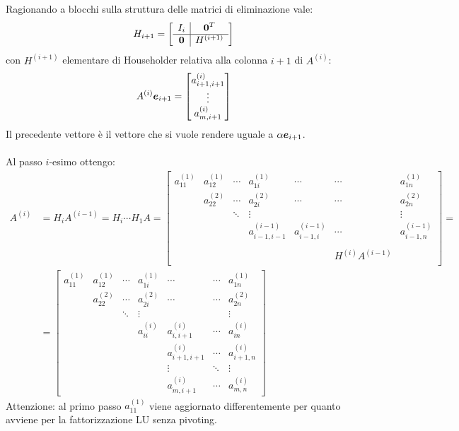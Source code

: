 \begin{oss}
Ragionando a blocchi sulla struttura delle matrici di eliminazione vale:
\begin{displaymath}
H_{i+1} = \left [ \begin{array}{c|c}
I_{i} 		& 	\boldsymbol{0}^{T} \\
\hline
\boldsymbol{0}	&	H^{(i+1)}
\end{array} \right ]
\end{displaymath}
con $H^{(i+1)}$ elementare di Householder relativa alla colonna $i+1$ di
$A^{(i)}$:
\begin{displaymath}
A^{(i)}\boldsymbol{e}_{i+1} = \begin{bmatrix}
a_{i+1, i+1}^{(i)} \\
\vdots \\
a_{m, i+1}^{(i)}
\end{bmatrix}
\end{displaymath}
Il precedente vettore \`e il vettore che si vuole rendere uguale a
$\alpha\boldsymbol{e}_{i+1}$.
\\\\
Al passo $i$-esimo ottengo:
\begin{displaymath}
\begin{split}
A^{(i)} &= H_{i}A^{(i-1)} = H_{i} \cdots H_{1}A  =
\begin{bmatrix}
a_{11}^{(1)} & a_{12}^{(1)} & \cdots & a_{1i}^{(1)}	& \cdots & \cdots &
a_{1n}^{(1)} \\ 
	& a_{22}^{(2)} & \cdots	& a_{2i}^{(2)} & \cdots & \cdots & a_{2n}^{(2)} \\
	&	&	\ddots	& \vdots &	&	& \vdots \\
	&	&	& a_{i-1,i-1}^{(i-1)}	& a_{i-1,i}^{(i-1)} & \cdots & a_{i-1,n}^{(i-1)}  \\
	&	&	& 	&  \\
 	& 	&	&	&  & H^{(i)}A^{(i-1)} &  \\
	& 	&	&	& 	&		&  
\end{bmatrix} = \\ 
& = \begin{bmatrix}
a_{11}^{(1)} & a_{12}^{(1)} & \cdots & a_{1i}^{(1)}	& \cdots & \cdots &
a_{1n}^{(1)} \\ 
	& a_{22}^{(2)} & \cdots	& a_{2i}^{(2)} & \cdots & \cdots & a_{2n}^{(2)} \\
	&	&	\ddots	& \vdots &	&	& \vdots \\
	&	&	& a_{ii}^{(i)}	& a_{i,i+1}^{(i)} & \cdots & a_{in}^{(i)}  \\
	&	&	& 	& a_{i+1,i+1}^{(i)} & \cdots & a_{i+1,n}^{(i)}  \\
 	& 	&	&	& \vdots & \ddots & \vdots \\
	& 	&	&	& a_{m, i+1}^{(i)}	&	\cdots	& a_{m, n}^{(i)} 
\end{bmatrix}
\end{split}
\end{displaymath}
Attenzione: al primo passo $a_{11}^{(1)}$ viene aggiornato differentemente per
quanto avviene per la fattorizzazione LU senza pivoting.
\end{oss}

